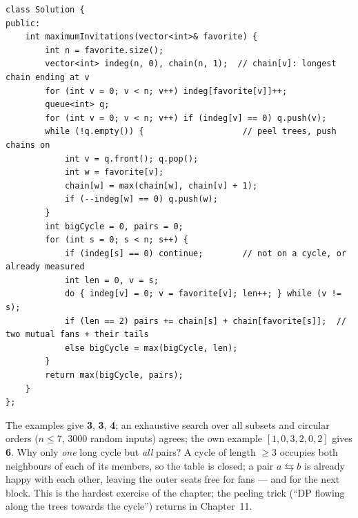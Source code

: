 \begin{solutionbox}
\begin{lstlisting}[style=cpp]
class Solution {
public:
    int maximumInvitations(vector<int>& favorite) {
        int n = favorite.size();
        vector<int> indeg(n, 0), chain(n, 1);  // chain[v]: longest chain ending at v
        for (int v = 0; v < n; v++) indeg[favorite[v]]++;
        queue<int> q;
        for (int v = 0; v < n; v++) if (indeg[v] == 0) q.push(v);
        while (!q.empty()) {                    // peel trees, push chains on
            int v = q.front(); q.pop();
            int w = favorite[v];
            chain[w] = max(chain[w], chain[v] + 1);
            if (--indeg[w] == 0) q.push(w);
        }
        int bigCycle = 0, pairs = 0;
        for (int s = 0; s < n; s++) {
            if (indeg[s] == 0) continue;        // not on a cycle, or already measured
            int len = 0, v = s;
            do { indeg[v] = 0; v = favorite[v]; len++; } while (v != s);
            if (len == 2) pairs += chain[s] + chain[favorite[s]];  // two mutual fans + their tails
            else bigCycle = max(bigCycle, len);
        }
        return max(bigCycle, pairs);
    }
};
\end{lstlisting}
The examples give \textbf{3}, \textbf{3}, \textbf{4}; an exhaustive search over all subsets and circular orders ($n \le 7$, $3000$ random inputs) agrees; the own example $[1,0,3,2,0,2]$ gives \textbf{6}. Why only \emph{one} long cycle but \emph{all} pairs? A cycle of length $\ge 3$ occupies both neighbours of each of its members, so the table is closed; a pair $a \leftrightarrows b$ is already happy with each other, leaving the outer seats free for fans --- and for the next block. This is the hardest exercise of the chapter; the peeling trick (``DP flowing along the trees towards the cycle'') returns in Chapter~11.
\end{solutionbox}

